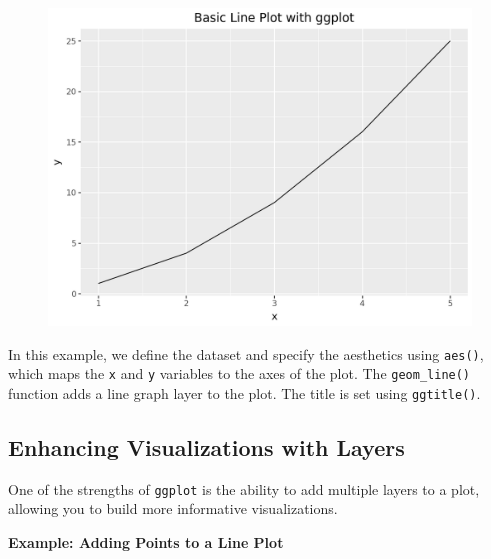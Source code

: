 \documentclass[
  letterpaper,
  DIV=11,
  numbers=noendperiod]{scrreprt}
\begin{document}
\begin{figure}[H]

{\centering \includegraphics{15_Data_Vis_files/figure-pdf/cell-19-output-1.png}

}

\end{figure}

In this example, we define the dataset and specify the aesthetics using
\texttt{aes()}, which maps the \texttt{x} and \texttt{y} variables to
the axes of the plot. The \texttt{geom\_line()} function adds a line
graph layer to the plot. The title is set using \texttt{ggtitle()}.

\hypertarget{enhancing-visualizations-with-layers}{%
\subsection{Enhancing Visualizations with
Layers}\label{enhancing-visualizations-with-layers}}

One of the strengths of \texttt{ggplot} is the ability to add multiple
layers to a plot, allowing you to build more informative visualizations.

\textbf{Example: Adding Points to a Line Plot}
\end{document}
